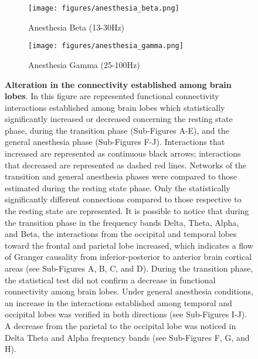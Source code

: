 \documentclass[twoside]{article}
\begin{document}
\begin{figure}[htb]
\begin{subfigure}[b]{.19\linewidth}
  \end{subfigure}%
  \begin{subfigure}[b]{.19\linewidth}
    \centering
    \texttt{[image: figures/anesthesia\_beta.png]}
    \caption{Anesthesia \newline  Beta (13-30Hz)}\label{fig:1i}
  \end{subfigure}%
  \begin{subfigure}[b]{.19\linewidth}
   \centering
    \texttt{[image: figures/anesthesia\_gamma.png]}
    \caption{Anesthesia \newline Gamma (25-100Hz)}\label{fig:1j}
  \end{subfigure}%
%
  \caption{\textbf{Alteration in the connectivity established among brain lobes}. In this figure are represented functional connectivity interactions established among brain lobes which statistically significantly increased or decreased concerning the resting state phase, during the transition phase (Sub-Figures A-E), and the general anesthesia phase (Sub-Figures F-J). Interactions that increased are represented as continuous black arrows; interactions that decreased are represented as dashed red lines. Networks of the transition and general anesthesia phases were compared to those estimated during the resting state phase. Only the statistically significantly different connections compared to those respective to the resting state are represented. It is possible to notice that during the transition phase in the frequency bands Delta, Theta, Alpha, and Beta, the interactions from the occipital and temporal lobes toward the frontal and parietal lobe increased, which indicates a flow of Granger causality from inferior-posterior to anterior brain cortical areas (see Sub-Figures A, B, C, and D). During the transition phase, the statistical test did not confirm a decrease in functional connectivity among brain lobes. Under general anesthesia conditions, an increase in the interactions established among temporal and occipital lobes was verified in both directions (see Sub-Figures I-J). A decrease from the parietal to the occipital lobe was noticed in Delta Theta and Alpha frequency bands (see Sub-Figures F, G, and H).
}\label{fig:1}
\hypertarget{FIGURE4}{}
\end{figure}
\end{document}
